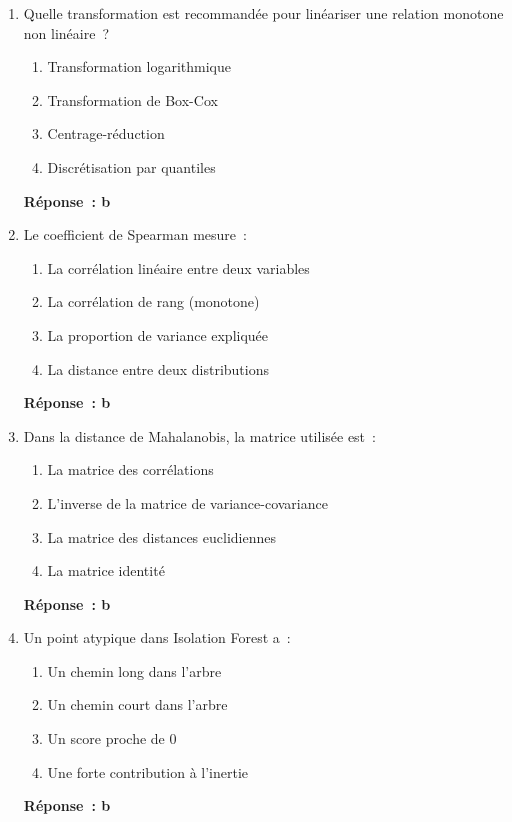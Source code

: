 \documentclass[a4paper,11pt]{article}
\theoremstyle{definition}
\theoremstyle{remark}
\begin{document}
\begin{enumerate}

  \item Quelle transformation est recommandée pour linéariser une
    relation monotone non linéaire~?
    \begin{enumerate}
      \item Transformation logarithmique
      \item Transformation de Box-Cox
      \item Centrage-réduction
      \item Discrétisation par quantiles
    \end{enumerate}
    \textbf{Réponse~: b}

  \item Le coefficient de Spearman mesure~:
    \begin{enumerate}
      \item La corrélation linéaire entre deux variables
      \item La corrélation de rang (monotone)
      \item La proportion de variance expliquée
      \item La distance entre deux distributions
    \end{enumerate}
    \textbf{Réponse~: b}

  \item Dans la distance de Mahalanobis, la matrice utilisée est~:
    \begin{enumerate}
      \item La matrice des corrélations
      \item L'inverse de la matrice de variance-covariance
      \item La matrice des distances euclidiennes
      \item La matrice identité
    \end{enumerate}
    \textbf{Réponse~: b}

  \item Un point atypique dans Isolation Forest a~:
    \begin{enumerate}
      \item Un chemin long dans l'arbre
      \item Un chemin court dans l'arbre
      \item Un score proche de 0
      \item Une forte contribution à l'inertie
    \end{enumerate}
    \textbf{Réponse~: b}


\end{enumerate}
\end{document}
